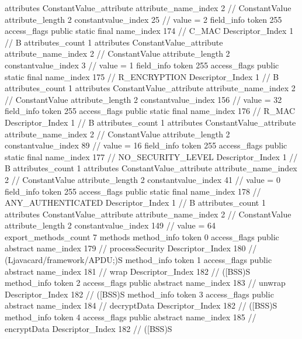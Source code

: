 {{{{{				attributes {
				ConstantValue_attribute {
					attribute_name_index	2		// ConstantValue
					attribute_length	2
					constantvalue_index	25		// value = 2
				}
				}
			}
			field_info {
				token	255
				access_flags	public static final
				name_index	174		// C_MAC
				Descriptor_Index	1		// B
				attributes_count	1
				attributes {
				ConstantValue_attribute {
					attribute_name_index	2		// ConstantValue
					attribute_length	2
					constantvalue_index	3		// value = 1
				}
				}
			}
			field_info {
				token	255
				access_flags	public static final
				name_index	175		// R_ENCRYPTION
				Descriptor_Index	1		// B
				attributes_count	1
				attributes {
				ConstantValue_attribute {
					attribute_name_index	2		// ConstantValue
					attribute_length	2
					constantvalue_index	156		// value = 32
				}
				}
			}
			field_info {
				token	255
				access_flags	public static final
				name_index	176		// R_MAC
				Descriptor_Index	1		// B
				attributes_count	1
				attributes {
				ConstantValue_attribute {
					attribute_name_index	2		// ConstantValue
					attribute_length	2
					constantvalue_index	89		// value = 16
				}
				}
			}
			field_info {
				token	255
				access_flags	public static final
				name_index	177		// NO_SECURITY_LEVEL
				Descriptor_Index	1		// B
				attributes_count	1
				attributes {
				ConstantValue_attribute {
					attribute_name_index	2		// ConstantValue
					attribute_length	2
					constantvalue_index	41		// value = 0
				}
				}
			}
			field_info {
				token	255
				access_flags	public static final
				name_index	178		// ANY_AUTHENTICATED
				Descriptor_Index	1		// B
				attributes_count	1
				attributes {
				ConstantValue_attribute {
					attribute_name_index	2		// ConstantValue
					attribute_length	2
					constantvalue_index	149		// value = 64
				}
				}
			}
			}
			export_methods_count	7
			methods {
				method_info {
					token	0
					access_flags	public abstract
					name_index	179		// processSecurity
					Descriptor_Index	180		// (Ljavacard/framework/APDU;)S
				}
				method_info {
					token	1
					access_flags	public abstract
					name_index	181		// wrap
					Descriptor_Index	182		// ([BSS)S
				}
				method_info {
					token	2
					access_flags	public abstract
					name_index	183		// unwrap
					Descriptor_Index	182		// ([BSS)S
				}
				method_info {
					token	3
					access_flags	public abstract
					name_index	184		// decryptData
					Descriptor_Index	182		// ([BSS)S
				}
				method_info {
					token	4
					access_flags	public abstract
					name_index	185		// encryptData
					Descriptor_Index	182		// ([BSS)S
}}}}}
